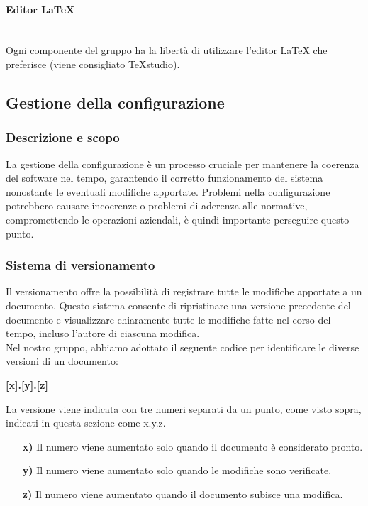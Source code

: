 \documentclass{article}
\begin{document}
\paragraph{Editor LaTeX}~\\
Ogni componente del gruppo ha la libertà di utilizzare l'editor LaTeX che preferisce (viene consigliato TeXstudio).

\subsection{Gestione della configurazione}
    \subsubsection{Descrizione e scopo}
    La gestione della configurazione è un processo cruciale per mantenere la coerenza del software nel tempo, garantendo il corretto funzionamento del sistema nonostante le eventuali modifiche apportate. Problemi nella configurazione potrebbero causare incoerenze o problemi di aderenza alle normative, compromettendo le operazioni aziendali, è quindi importante perseguire questo punto.
    
    \subsubsection{Sistema di versionamento}
    Il versionamento offre la possibilità di registrare tutte le modifiche apportate a un documento. Questo sistema consente di ripristinare una versione precedente del documento e visualizzare chiaramente tutte le modifiche fatte nel corso del tempo, incluso l'autore di ciascuna modifica.\\
    Nel nostro gruppo, abbiamo adottato il seguente codice per identificare le diverse versioni di un documento:
    \begin{center}
    \textbf{[x].[y].[z]}
    \end{center}
    La versione viene indicata con tre numeri separati da un punto, come visto sopra, indicati in questa sezione come x.y.z.
    \begin{itemize}
    \item[\textbf{x)}] Il numero viene aumentato solo quando il documento è considerato pronto.
    \item[\textbf{y)}] Il numero viene aumentato solo quando le modifiche sono verificate.
    \item[\textbf{z)}] Il numero viene aumentato quando il documento subisce una modifica.
    \end{itemize}  
    
\end{document}
